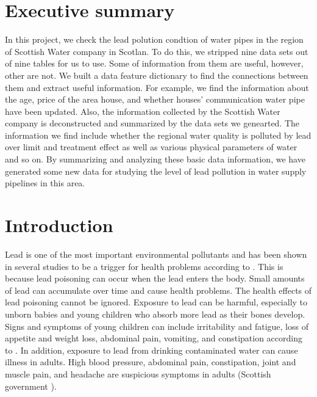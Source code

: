 \documentclass[11pt,twoside]{article}
\numberwithin{Theorem}{section}
\numberwithin{Definition}{section}
\numberwithin{Lemma}{section}
\numberwithin{Algorithm}{section}
\numberwithin{equation}{section}
\begin{document}
\cleardoublepage

\setcounter{page}{1}


\clearpage

\section*{Executive summary}
\label{sec.summary}
In this project, we check the lead polution condtion of water pipes in the region of Scottish Water company in Scotlan. To do this, we stripped nine data sets out of nine tables for us to use. Some of information from them are useful, however, other are not. We built a data feature dictionary to find the connections between them and extract useful information. For example, we find the information about the age, price of the area house, and whether houses' communication water pipe have been updated. Also, the information collected by the Scottish Water company is deconstructed and summarized by the data sets we genearted. The information we find include whether the regional water quality is polluted by lead over limit and treatment effect as well as various physical parameters of water and so on. By summarizing and analyzing these basic data information, we have generated some new data for studying the level of lead pollution in water supply pipelines in this area.

\clearpage

\section{Introduction}
\label{sec.intro}
Lead is one of the most important environmental pollutants and has been shown in several studies to be a trigger for health problems according to \cite{ei}. This is because lead poisoning can occur when the lead enters the body. Small amounts of lead can accumulate over time and cause health problems. The health effects of lead poisoning cannot be ignored. Exposure to lead can be harmful, especially to unborn babies and young children who absorb more lead as their bones develop. Signs and symptoms of young children can include irritability and fatigue, loss of appetite and weight loss, abdominal pain, vomiting, and constipation according to \cite{stacy}. In addition, exposure to lead from drinking contaminated water can cause illness in adults. High blood pressure, abdominal pain, constipation, joint and muscle pain, and headache are suspicious symptoms in adults (Scottish government \citeyear{government}).
\end{document}
